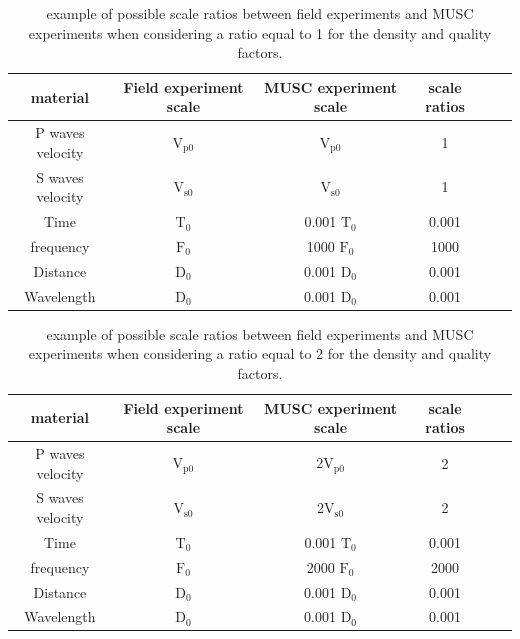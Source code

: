 \documentclass[manuscript,revised]{geophysics}
\begin{document}
\begin{table}[!ht]
\centering
\begin{tabular}{cccccc}
\hline
material & Field experiment scale & MUSC experiment scale & scale ratios \\
\hline
P waves velocity & $\mathrm{V_{p 0}}$ & $\mathrm{V_{p 0}}$ & 1 \\
S waves velocity & $\mathrm{V_{s 0}}$ & $\mathrm{V_{s 0}}$ & 1 \\
Time & $\mathrm{T_{0}}$ & 0.001 $\mathrm{T_{0}}$ & 0.001 \\
frequency & $\mathrm{F_{0}}$ & 1000 $\mathrm{F_{0}}$ & 1000 \\
Distance & $\mathrm{D_{0}}$ & 0.001 $\mathrm{D_{0}}$ & 0.001 \\
Wavelength & $\mathrm{D_{0}}$ & 0.001 $\mathrm{D_{0}}$ & 0.001 \\
\hline
\end{tabular}
\caption{ example of possible scale ratios between field experiments and MUSC experiments when considering a ratio equal to 1 for the density and quality factors.}
\label{epoxy-resin}
\end{table}

\begin{table}[!ht]
\centering
\begin{tabular}{cccccc}
\hline
material & Field experiment scale & MUSC experiment scale & scale ratios \\
\hline
P waves velocity & $\mathrm{V_{p 0}}$ & $\mathrm{2V_{p 0}}$ & 2 \\
S waves velocity & $\mathrm{V_{s 0}}$ & $\mathrm{2V_{s 0}}$ & 2 \\
Time & $\mathrm{T_{0}}$ & 0.001 $\mathrm{T_{0}}$ & 0.001 \\
frequency & $\mathrm{F_{0}}$ & 2000 $\mathrm{F_{0}}$ & 2000 \\
Distance & $\mathrm{D_{0}}$ & 0.001 $\mathrm{D_{0}}$ & 0.001 \\
Wavelength & $\mathrm{D_{0}}$ & 0.001 $\mathrm{D_{0}}$ & 0.001 \\
\hline
\end{tabular}
\caption{ example of possible scale ratios between field experiments and MUSC experiments when considering a ratio equal to 2 for the density and quality factors.}
\label{epoxy-resin}
\end{table}
\end{document}
